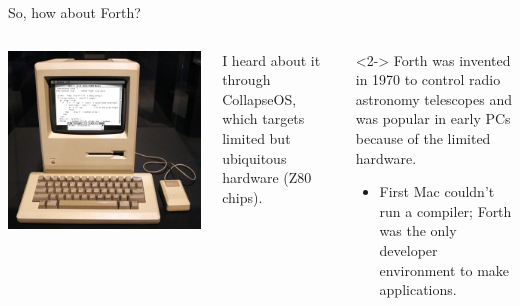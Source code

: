 \documentclass[aspectratio=169]{beamer}
\begin{document}
\begin{frame}{So, how about Forth?}
\vspace{0.28 cm}
\begin{columns}
\includegraphics[width=\linewidth]{macintosh-forth-code.jpg}

I heard about it through CollapseOS, which targets limited but ubiquitous hardware (Z80 chips).

\vspace{0.5 cm}
\begin{uncoverenv}<2->
Forth was invented in 1970 to control radio astronomy telescopes and was popular in early PCs because of the limited hardware.
\begin{itemize}
\item First Mac couldn't run a compiler; Forth was the only developer environment to make applications.
\end{itemize}
\end{uncoverenv}

\vspace{0.5 cm}
\end{columns}
\end{frame}
\end{document}
